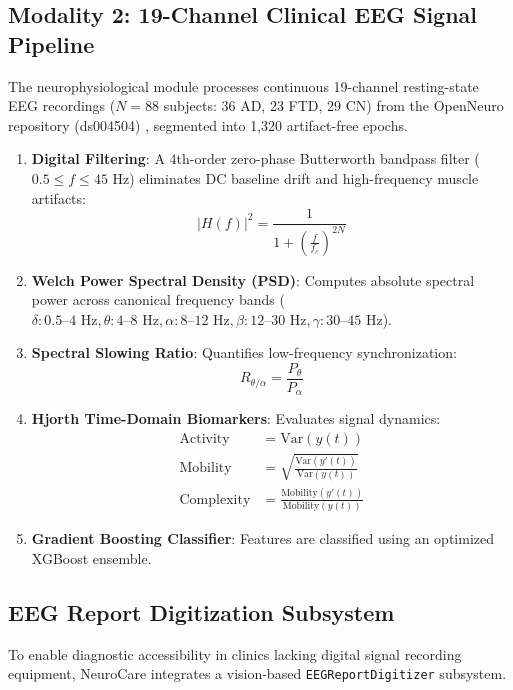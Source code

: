\documentclass[conference]{IEEEtran}
\begin{document}
\subsection{Modality 2: 19-Channel Clinical EEG Signal Pipeline}
The neurophysiological module processes continuous 19-channel resting-state EEG recordings ($N = 88$ subjects: 36 AD, 23 FTD, 29 CN) from the OpenNeuro repository (ds004504) \cite{miltiadous2023}, segmented into 1,320 artifact-free epochs.
\begin{enumerate}
    \item \textbf{Digital Filtering}: A 4th-order zero-phase Butterworth bandpass filter ($0.5 \le f \le 45\text{ Hz}$) eliminates DC baseline drift and high-frequency muscle artifacts:
    \begin{equation}
    |H(f)|^2 = \frac{1}{1 + \left(\frac{f}{f_c}\right)^{2N}}
    \end{equation}
    \item \textbf{Welch Power Spectral Density (PSD)}: Computes absolute spectral power across canonical frequency bands ($\delta: 0.5\text{--}4\text{ Hz}, \theta: 4\text{--}8\text{ Hz}, \alpha: 8\text{--}12\text{ Hz}, \beta: 12\text{--}30\text{ Hz}, \gamma: 30\text{--}45\text{ Hz}$).
    \item \textbf{Spectral Slowing Ratio}: Quantifies low-frequency synchronization:
    \begin{equation}
    R_{\theta/\alpha} = \frac{P_\theta}{P_\alpha}
    \end{equation}
    \item \textbf{Hjorth Time-Domain Biomarkers}: Evaluates signal dynamics:
    \begin{align}
    \text{Activity} &= \text{Var}(y(t)) \\
    \text{Mobility} &= \sqrt{\frac{\text{Var}(y'(t))}{\text{Var}(y(t))}} \\
    \text{Complexity} &= \frac{\text{Mobility}(y'(t))}{\text{Mobility}(y(t))}
    \end{align}
    \item \textbf{Gradient Boosting Classifier}: Features are classified using an optimized XGBoost ensemble.
\end{enumerate}

\subsection{EEG Report Digitization Subsystem}
To enable diagnostic accessibility in clinics lacking digital signal recording equipment, NeuroCare integrates a vision-based \texttt{EEGReportDigitizer} subsystem.
\end{document}

